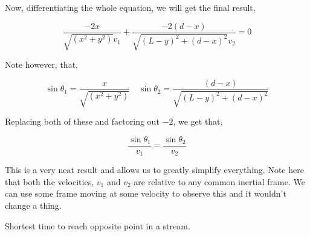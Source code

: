 Now, differentiating the whole equation, we will get the final result,

\begin{equation}
    \frac{-2x}{\sqrt{(x^2+y^2)}v_1} + \frac{-2(d-x)}{\sqrt{(L-y)^2 + (d-x)^2}v_2} = 0 
\end{equation}

Note however, that, 

\begin{equation*}
    \sin\theta_1 = \frac{x}{\sqrt{(x^2+y^2)}} \quad \sin\theta_2 = \frac{(d-x)}{\sqrt{(L-y)^2 + (d-x)^2}}
\end{equation*}

Replacing both of these and factoring out \(-2\), we get that, 

\begin{equation}
    \boxed{\frac{\sin\theta_1}{v_1} = \frac{\sin\theta_2}{v_2}}
\end{equation}

This is a very neat result and allows us to greatly simplify everything. Note 
here that both the velocities, \(v_1\) and \(v_2\) are relative to any common inertial
frame. We can use some frame moving at some velocity to observe this and it wouldn't change 
a thing. 

\begin{marginfigure}
    \centering
    \caption{Shortest time to reach opposite point in a stream.}
    \label{fig: fermat example}
\end{marginfigure}

